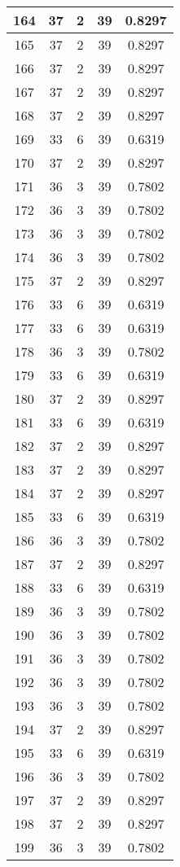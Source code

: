 \documentclass[letterpaper, 12pt]{article}
\begin{document}
\begin{longtable}{|c|c|c|c|c|}
\hline
164 & 37 & 2 & 39 & 0.8297 \\
\hline
165 & 37 & 2 & 39 & 0.8297 \\
\hline
166 & 37 & 2 & 39 & 0.8297 \\
\hline
167 & 37 & 2 & 39 & 0.8297 \\
\hline
168 & 37 & 2 & 39 & 0.8297 \\
\hline
169 & 33 & 6 & 39 & 0.6319 \\
\hline
170 & 37 & 2 & 39 & 0.8297 \\
\hline
171 & 36 & 3 & 39 & 0.7802 \\
\hline
172 & 36 & 3 & 39 & 0.7802 \\
\hline
173 & 36 & 3 & 39 & 0.7802 \\
\hline
174 & 36 & 3 & 39 & 0.7802 \\
\hline
175 & 37 & 2 & 39 & 0.8297 \\
\hline
176 & 33 & 6 & 39 & 0.6319 \\
\hline
177 & 33 & 6 & 39 & 0.6319 \\
\hline
178 & 36 & 3 & 39 & 0.7802 \\
\hline
179 & 33 & 6 & 39 & 0.6319 \\
\hline
180 & 37 & 2 & 39 & 0.8297 \\
\hline
181 & 33 & 6 & 39 & 0.6319 \\
\hline
182 & 37 & 2 & 39 & 0.8297 \\
\hline
183 & 37 & 2 & 39 & 0.8297 \\
\hline
184 & 37 & 2 & 39 & 0.8297 \\
\hline
185 & 33 & 6 & 39 & 0.6319 \\
\hline
186 & 36 & 3 & 39 & 0.7802 \\
\hline
187 & 37 & 2 & 39 & 0.8297 \\
\hline
188 & 33 & 6 & 39 & 0.6319 \\
\hline
189 & 36 & 3 & 39 & 0.7802 \\
\hline
190 & 36 & 3 & 39 & 0.7802 \\
\hline
191 & 36 & 3 & 39 & 0.7802 \\
\hline
192 & 36 & 3 & 39 & 0.7802 \\
\hline
193 & 36 & 3 & 39 & 0.7802 \\
\hline
194 & 37 & 2 & 39 & 0.8297 \\
\hline
195 & 33 & 6 & 39 & 0.6319 \\
\hline
196 & 36 & 3 & 39 & 0.7802 \\
\hline
197 & 37 & 2 & 39 & 0.8297 \\
\hline
198 & 37 & 2 & 39 & 0.8297 \\
\hline
199 & 36 & 3 & 39 & 0.7802 \\
\hline
\end{longtable}
\end{document}
